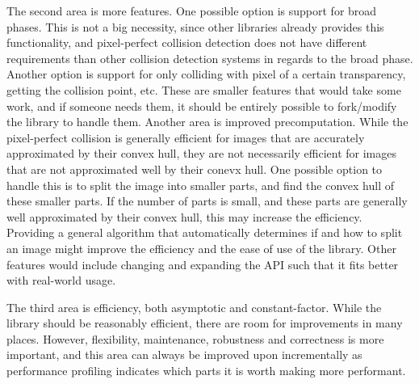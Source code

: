 The second area is more features. One possible option is support for
broad phases. This is not a big necessity, since other libraries
already provides this functionality, and pixel-perfect collision
detection does not have different requirements than other collision
detection systems in regards to the broad phase.
Another option is support for only colliding with pixel of a
certain transparency, getting the collision point, etc.
These are smaller features that would take some work,
and if someone needs them, it should be entirely possible
to fork/modify the library to handle them.
Another area is improved precomputation. While the pixel-perfect
collision is generally efficient for images that are accurately approximated
by their convex hull, they are not necessarily efficient for images
that are not approximated well by their conevx hull.
One possible option to handle this is to split the image into smaller
parts, and find the convex hull of these smaller parts.
If the number of parts is small, and these parts are generally
well approximated by their convex hull, this may increase the
efficiency. Providing a general algorithm that automatically
determines if and how to split an image might improve the
efficiency and the ease of use of the library.
Other features would include changing and expanding the
API such that it fits better with real-world usage.

The third area is efficiency, both asymptotic and constant-factor. While the library should be
reasonably efficient, there are room for improvements in many
places. However, flexibility, maintenance, robustness and correctness is more
important, and this area can always be improved upon incrementally
as performance profiling indicates which parts it is worth
making more performant.

